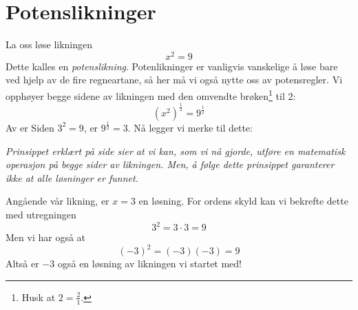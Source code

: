 \newpage
{}
\section{Potenslikninger}
La oss løse likningen
\[ x^2=9 \]
Dette kalles en \textit{potenslikning}. Potenlikninger er vanligvis vanskelige å løse bare ved hjelp av de fire regneartane, så her må vi også nytte oss av potensregler. Vi opphøyer begge sidene av likningen med den omvendte brøken\footnote{Husk at $ 2=\frac{2}{1} $.} til 2:
\[ \left(x^2\right)^\frac{1}{2}=9^\frac{1}{2} \]
Av  er
Siden $ 3^2=9 $, er $ 9^\frac{1}{2}=3 $. Nå legger vi merke til dette: \vsk

\textit{Prinsippet erklært på side \pageref{principle} sier at vi kan, som vi nå gjorde, utføre en matematisk operasjon på begge sider av likningen. Men, å følge dette prinsippet garanterer ikke at alle løsninger er funnet.} \\ \vsk

Angående vår likning, er $ {x=3} $ en løsning. For ordens skyld kan vi bekrefte dette med utregningen
\[ 3^2=3\cdot3=9 \]
Men vi har også at
\[ (-3)^2=(-3)(-3)=9 \]
Altså er $ -3 $ også en løsning av likningen vi startet med! \regv

